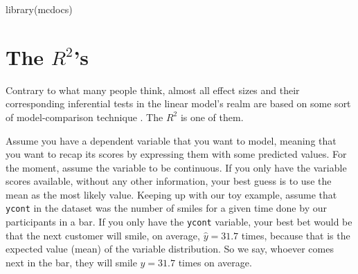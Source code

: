 \documentclass[
]{book}
\newenvironment{Shaded}{\begin{snugshade}}{\end{snugshade}}
\newcommand{\FunctionTok}[1]{\textcolor[rgb]{0.00,0.00,0.00}{#1}}
\newcommand{\NormalTok}[1]{#1}
\begin{document}
\begin{Shaded}
\begin{Highlighting}[]
\FunctionTok{library}\NormalTok{(mcdocs)}
\end{Highlighting}
\end{Shaded}

\hypertarget{appendixa}{%
\chapter{\texorpdfstring{The \(R^2\)'s}{The R\^{}2's}}\label{appendixa}}

Contrary to what many people think, almost all effect sizes and their corresponding inferential tests in the linear model's realm are based on some sort of model-comparison technique \citep{judd2017data}. The \(R^2\) is one of them.

Assume you have a dependent variable that you want to model, meaning that you want to recap its scores by expressing them with some predicted values. For the moment, assume the variable to be continuous. If you only have the variable scores available, without any other information, your best guess is to use the mean as the most likely value. Keeping up with our toy example, assume that \texttt{ycont} in the dataset was the number of smiles for a given time done by our participants in a bar. If you only have the \texttt{ycont} variable, your best bet would be that the next customer will smile, on average, \(\hat{y}=31.7\) times, because that is the expected value (mean) of the variable distribution. So we say, whoever comes next in the bar, they will smile \(\hat{y}=31.7\) times on average.
\end{document}
